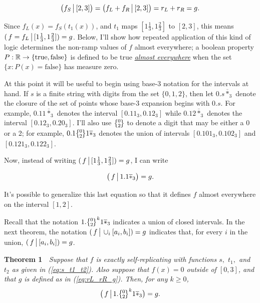 \documentclass[]{article}
\begin{document}
\[\big(f_S \,\big|\, [2,3]\big) = \big(f_L + f_R \,\big|\, [2, 3]\big) =
r_L + r_R = g.\]

Since \(f_L(x) = f_S(t_1(x))\), and \(t_1\) maps
\([1\tfrac{1}{3}, 1\tfrac{2}{3}]\) to \([2,3]\), this means
\((\,f=f_L \,\big|\, [1\tfrac{1}{3}, 1\tfrac{2}{3}]) = g\). Below, I'll
show how repeated application of this kind of logic determines the
non-ramp values of \(f\) almost everywhere; a boolean property
\(P:\mathbb{R}\to\{\text{true},\text{false}\}\) is defined to be true
\href{https://en.wikipedia.org/wiki/Almost_everywhere}{\emph{almost
everywhere}} when the set \(\{x : P(x) = \text{false}\}\) has measure
zero.

\newcommand{\zerotwo}{\big\{\!\raise1.5pt\hbox{$\genfrac{}{}{0pt}{}
{\lower1.8pt\hbox{$\smash{\scriptstyle 0}$}}
{\lower1pt\hbox{$\smash{\scriptstyle 2}$}}$}\!\big\}}

\newcommand{\lstar}{\overline{*}_3}

At this point it will be useful to begin using base-3 notation for the
intervals at hand. If \(s\) is a finite string with digits from the set
\(\{0, 1, 2\}\), then let \(0.s\lstar\) denote the closure of the set of
points whose base-3 expansion begins with \(0.s\). For example,
\(0.11\lstar\) denotes the interval \([0.11_3, 0.12_3]\) while
\(0.12\lstar\) denotes the interval \([0.12_3, 0.20_3]\). I'll also use
\(\zerotwo\) to denote a digit that may be either a 0 or a 2; for
example, \(0.1\zerotwo 1\lstar\) denotes the union of intervals
\([0.101_3, 0.102_3]\) and \([0.121_3, 0.122_3]\).

Now, instead of writing
\((\,f \,\big|\, [1\tfrac{1}{3}, 1\tfrac{2}{3}]) = g\), I can write

\begin{equation}\big(\,f \restrict 1.1\lstar\big) = g.\label{eq:nonpl_base_case}\end{equation}

It's possible to generalize this last equation so that it defines \(f\)
almost everywhere on the interval \([1, 2]\).

Recall that the notation \(1.\zerotwo^k1\lstar\) indicates a union of
closed intervals. In the next theorem, the notation
\((\,f \,\big|\, \cup_i [a_i,b_i]) = g\) indicates that, for every \(i\)
in the union, \((\,f \,\big|\, [a_i,b_i]) = g\).

\textbf{Theorem 1} \(\;\) \emph{Suppose that \(f\) is exactly
self-replicating with functions \(s,\) \(t_1,\) and \(t_2\) as given in
(\ref{eq:s_t1_t2}). Also suppose that \(f(x) = 0\) outside of \([0,3]\),
and that \(g\) is defined as in (\ref{eq:rL_rR_g}). Then, for any
\(k\ge 0\), \[\big(\,f \restrict 1.\zerotwo^k1\lstar\big)=g.\]}
\end{document}
